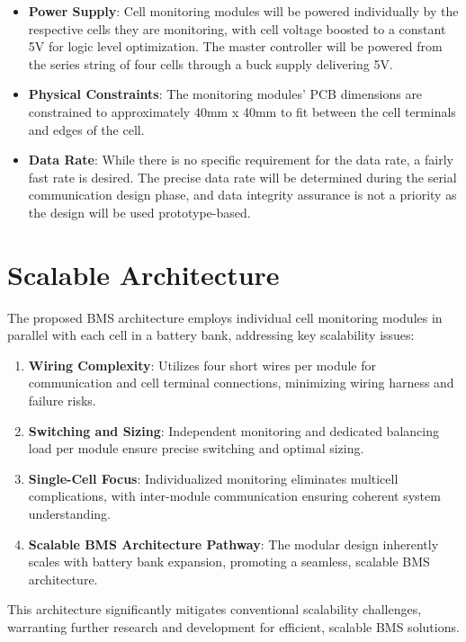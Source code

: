 \begin{itemize}
    \item \textbf{Power Supply}: Cell monitoring modules will be powered individually by the respective cells they are monitoring, with cell voltage boosted to a constant 5V for logic level optimization. The master controller will be powered from the series string of four cells through a buck supply delivering 5V.
    
    \item \textbf{Physical Constraints}: The monitoring modules' PCB dimensions are constrained to approximately 40mm x 40mm to fit between the cell terminals and edges of the cell.
    
    \item \textbf{Data Rate}: While there is no specific requirement for the data rate, a fairly fast rate is desired. The precise data rate will be determined during the serial communication design phase, and data integrity assurance is not a priority as the design will be used prototype-based.
\end{itemize}
\section{Scalable Architecture}\label{sec:scale_HLovv}
The proposed BMS architecture employs individual cell monitoring modules in parallel with each cell in a battery bank, addressing key scalability issues:

\begin{enumerate}
    \item \textbf{Wiring Complexity}: Utilizes four short wires per module for communication and cell terminal connections, minimizing wiring harness and failure risks.
    \item \textbf{Switching and Sizing}: Independent monitoring and dedicated balancing load per module ensure precise switching and optimal sizing.
    \item \textbf{Single-Cell Focus}: Individualized monitoring eliminates multicell complications, with inter-module communication ensuring coherent system understanding.
    \item \textbf{Scalable BMS Architecture Pathway}: The modular design inherently scales with battery bank expansion, promoting a seamless, scalable BMS architecture.
\end{enumerate}
\noindent
This architecture significantly mitigates conventional scalability challenges, warranting further research and development for efficient, scalable BMS solutions.
